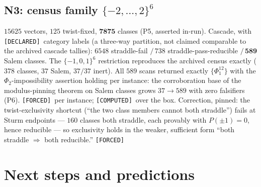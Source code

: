 \documentclass[11pt]{article}
\newcommand{\F}{\textnormal{\texttt{[FORCED]}}}
\newcommand{\C}{\textnormal{\texttt{[COMPUTED]}}}
\newcommand{\Dc}{\textnormal{\texttt{[DECLARED]}}}
\theoremstyle{definition}
\begin{document}
\subsection{N3: census family $\{-2,\dots,2\}^6$}
$15625$ vectors, $125$ twist-fixed, $\mathbf{7875}$ classes (P5, asserted
in-run). Cascade, with \Dc\ category labels (a three-way partition, not
claimed comparable to the archived cascade tallies): $6548$ straddle-fail
$/\,738$ straddle-pass-reducible $/\,\mathbf{589}$ Salem classes. The
$\{-1,0,1\}^6$ restriction reproduces the archived census exactly ($378$
classes, $37$ Salem, $37/37$ inert). All $589$ scans returned exactly
$\{\Phi_1^{12}\}$ with the $\Phi_2$-impossibility assertion holding per
instance: the corroboration base of the modulus-pinning theorem on Salem
classes grows $37\to589$ with zero falsifiers (P6). \F\ per instance; \C\
over the box. Correction, pinned: the twist-exclusivity shortcut (``the two
class members cannot both straddle'') fails at Sturm endpoints --- $160$
classes both straddle, each provably with $P(\pm1)=0$, hence reducible ---
so exclusivity holds in the weaker, sufficient form ``both straddle
$\Rightarrow$ both reducible.'' \F

\section{Next steps and predictions}\label{sec:next}
\end{document}
